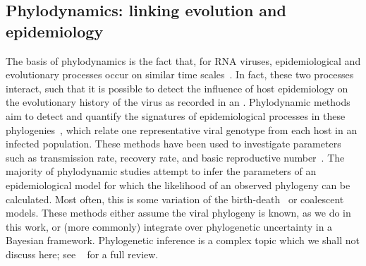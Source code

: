 \subsection{Phylodynamics: linking evolution and epidemiology}
\label{subsec:phylodynamics}


The basis of phylodynamics is the fact that, for RNA viruses, epidemiological
and evolutionary processes occur on similar time
scales~\autocite{drummond2003measurably}. In fact, these two processes
interact, such that it is possible to detect the influence of host epidemiology
on the evolutionary history of the virus as recorded in an . Phylodynamic methods aim to detect and quantify the
signatures of epidemiological processes in these
phylogenies~\autocite{pybus2009evolutionary, volz2013viral}, which relate one
representative viral genotype from each host in an infected population. These
methods have been used to investigate parameters such as transmission rate,
recovery rate, and basic reproductive number~\autocite{pybus2009evolutionary,
volz2013viral}. The majority of phylodynamic studies attempt to infer the
parameters of an epidemiological model for which the likelihood of an observed
phylogeny can be calculated. Most often, this is some variation of the
birth-death~\autocite{kendall1948generalized, stadler2012estimating} or
coalescent~\autocite{kingman1982coalescent, volz2012complex} models. These
methods either assume the viral phylogeny is known, as we do in this work, or
(more commonly) integrate over phylogenetic uncertainty in a Bayesian
framework. Phylogenetic inference is a complex topic which we shall not discuss
here; see \eg~\autocite{nei2000molecular} for a full review.

